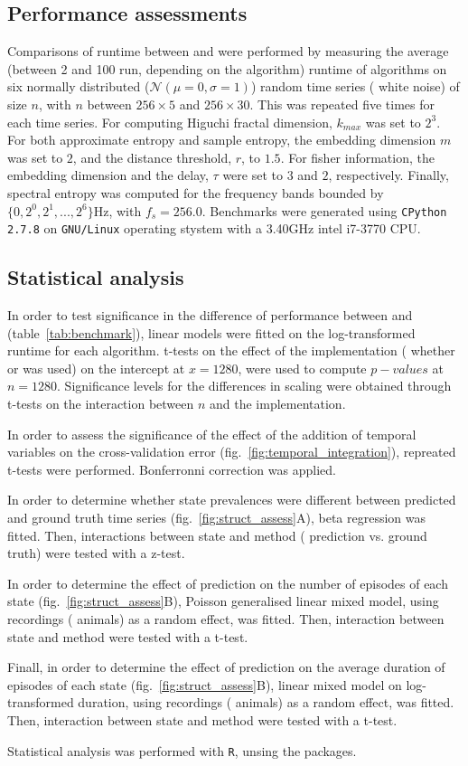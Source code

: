 \subsection{Performance assessments}
Comparisons of runtime between \pr{} and \pyeeg{} were performed by measuring the average (between 2 and 100 run, depending on the algorithm) runtime of algorithms on six
normally distributed ($\mathcal{N}(\mu=0,\sigma=1)$) random time series (\ie{} white noise) of size $n$,
with $n$ between $256 \times{} 5$ and $256 \times{} 30$.
This was repeated five times for each time series.
For computing  Higuchi fractal dimension, $k_{max}$ was set to $2^3$.
For both approximate entropy and sample entropy, the embedding dimension $m$ was set to $2$, and the distance threshold, $r$, to $1.5$.
For fisher information, the embedding dimension and the delay, $\tau$ were set to $3$ and $2$, respectively.
Finally, spectral entropy was computed for the frequency bands bounded by $\{0, 2^0, 2^1, ..., 2^6\}$Hz, with $f_s = 256.0$.
Benchmarks were generated using \texttt{CPython 2.7.8} on \texttt{GNU/Linux} operating stystem with a 3.40GHz intel i7-3770 CPU.

\subsection{Statistical analysis}
In order to test significance in the difference of performance between \pr{} and \pyeeg{} (table~\ref{tab:benchmark}),
linear models were fitted on the log-transformed runtime for each algorithm. 
t-tests on the effect of the implementation (\ie{} whether \pr{} or \pyeeg{} was used) on the intercept at $x=1280$, were used to compute $p-values$ at $n=1280$.
Significance levels for the differences in scaling were obtained through t-tests on the interaction between $n$ and the implementation.


In order to assess the significance of the effect of the addition of temporal variables on the cross-validation
error (fig.~\ref{fig:temporal_integration}), repreated t-tests were performed.
Bonferronni correction was applied.

In order to determine whether state prevalences were different between predicted and ground truth time series (fig.~\ref{fig:struct_assess}A),
beta regression \citationneeded{} was fitted. 
Then, interactions between state and method (\ie{} prediction vs. ground truth) were tested with a z-test.

In order to determine the effect of prediction on the number of episodes of each state (fig.~\ref{fig:struct_assess}B),
Poisson generalised linear mixed model\citationneeded{}, using recordings (\ie{} animals) as a random effect, was fitted. 
Then, interaction between state and method were tested with a t-test.

Finall, in order to determine the effect of prediction on the average duration of episodes of each state (fig.~\ref{fig:struct_assess}B),
linear mixed model\citationneeded{} on log-transformed duration, using recordings (\ie{} animals) as a random effect, was fitted. 
Then, interaction between state and method were tested with a t-test.

Statistical analysis was performed with \texttt{R}, unsing the \citationneeded{} packages.
